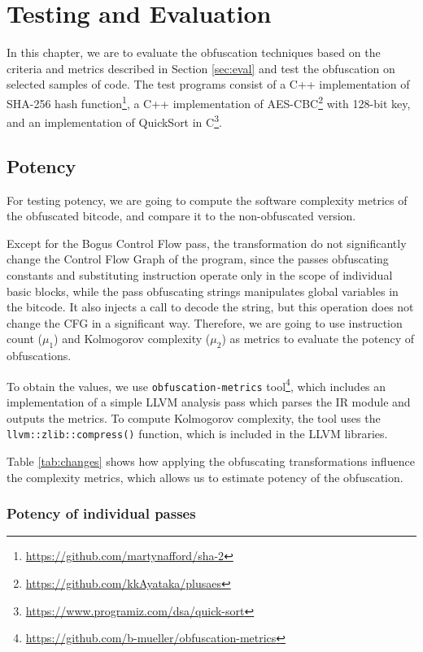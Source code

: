 \documentclass[
  digital, %
  notable,   %
  twoside, %
  nolof,     %
  nolot,     %
]{fithesis3}
\theoremstyle{definition}
\begin{document}
\chapter{Testing and Evaluation}
In this chapter, we are to evaluate the obfuscation techniques based on the criteria and metrics described in Section \ref{sec:eval} 
and test the obfuscation on selected samples of code. The test programs consist of a C++ implementation of SHA-256 hash function\footnote{\url{https://github.com/martynafford/sha-2}}, a C++ implementation of AES-CBC\footnote{\url{https://github.com/kkAyataka/plusaes}} with 128-bit key, and an implementation of QuickSort in C\footnote{\url{https://www.programiz.com/dsa/quick-sort}}.

\section{Potency}
For testing potency, we are going to compute the software complexity metrics of the obfuscated bitcode, and compare it to the non-obfuscated version. 

Except for the Bogus Control Flow pass, the transformation do not significantly change the Control Flow Graph of the program, since the passes obfuscating constants and substituting instruction operate only in the scope of individual basic blocks, while the pass obfuscating strings manipulates global variables in the bitcode. It also injects a call to decode the string, but this operation does not change the CFG in a significant way. Therefore, we are going to use instruction count ($\mu_1$) and Kolmogorov complexity ($\mu_2$) as metrics to evaluate the potency of obfuscations. 

To obtain the values, we use \texttt{obfuscation-metrics} tool\footnote{\url{https://github.com/b-mueller/obfuscation-metrics}}, which includes an implementation of a simple LLVM analysis pass which parses the IR module and outputs the metrics. To compute Kolmogorov complexity, the tool uses the \texttt{llvm::zlib::compress()} function, which is included in the LLVM libraries. 

Table \ref{tab:changes} shows how applying the obfuscating transformations influence the complexity metrics, which allows us to estimate potency of the obfuscation. 

\subsection{Potency of individual passes}
\end{document}
